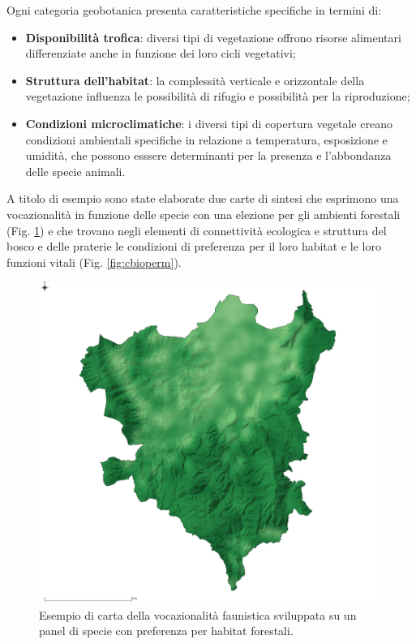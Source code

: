 \documentclass[
]{book}
\begin{document}
Ogni categoria geobotanica presenta caratteristiche specifiche in termini di:

\begin{itemize}
\item
  \textbf{Disponibilità trofica}: diversi tipi di vegetazione offrono risorse alimentari differenziate anche in funzione dei loro cicli vegetativi;
\item
  \textbf{Struttura dell'habitat}: la complessità verticale e orizzontale della vegetazione influenza le possibilità di rifugio e possibilità per la riproduzione;
\item
  \textbf{Condizioni microclimatiche}: i diversi tipi di copertura vegetale creano condizioni ambientali specifiche in relazione a temperatura, esposizione e umidità, che possono esssere determinanti per la presenza e l'abbondanza delle specie animali.
\end{itemize}

A titolo di esempio sono state elaborate due carte di sintesi che esprimono una vocazionalità in funzione delle specie con una elezione per gli ambienti forestali (Fig. \ref{fig:cidon}) e che trovano negli elementi di connettività ecologica e struttura del bosco e delle praterie le condizioni di preferenza per il loro habitat e le loro funzioni vitali (Fig. \ref{fig:cbioperm}).

\begin{figure}

{\centering \includegraphics[width=1\linewidth]{./figs/cartaIdoneita} 

}

\caption{Esempio di carta della vocazionalità faunistica sviluppata su un panel di specie con preferenza per habitat forestali.}\label{fig:cidon}
\end{figure}
\end{document}
